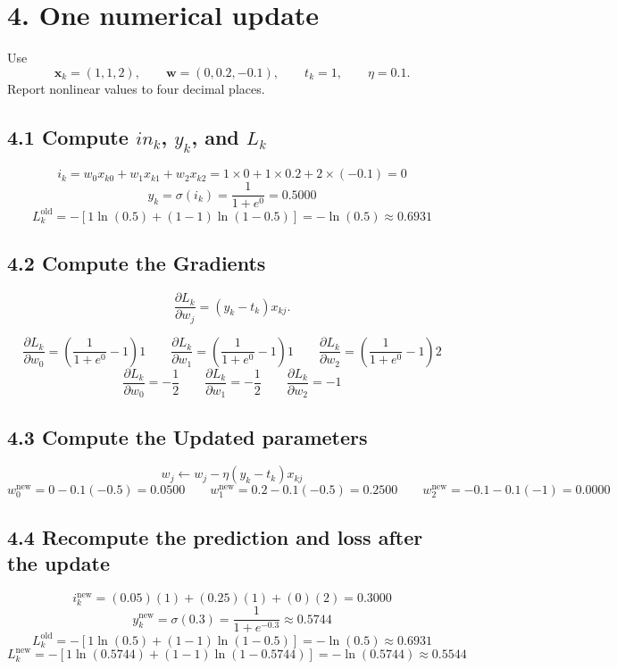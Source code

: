 \documentclass[11pt]{article}
\begin{document}
\section*{4. One numerical update}

Use
\[
\mathbf{x}_k=(1,1,2),\qquad
\mathbf{w}=(0,0.2,-0.1),\qquad
t_k=1,\qquad
\eta=0.1.
\]
Report nonlinear values to four decimal places.

\subsection*{4.1 Compute $in_k$, $y_k$, and $L_k$}
\[
i_k = w_0x_{k0}+w_1x_{k1}+w_2x_{k2} 
= 1\times0 + 1\times0.2 + 2\times(-0.1) = 0
\]
\[
y_k=\sigma(i_k)=\frac{1}{1+e^{0}} = 0.5000
\]
\[
L_k^{\text{old}}=-\left[1\ln(0.5)+(1-1)\ln(1-0.5)\right] = -\ln(0.5) \approx 0.6931
\]

\subsection*{4.2 Compute the Gradients}
\[
\frac{\partial L_k}{\partial w_j}=(y_k-t_k)x_{kj}.
\]

\[
\frac{\partial L_k}{\partial w_0}=(\frac{1}{1+e^{0}}-1)1\qquad
\frac{\partial L_k}{\partial w_1}=(\frac{1}{1+e^{0}}-1)1\qquad
\frac{\partial L_k}{\partial w_2}=(\frac{1}{1+e^{0}}-1)2
\]
\[
\frac{\partial L_k}{\partial w_0}=-\frac{1}{2}\qquad
\frac{\partial L_k}{\partial w_1}=-\frac{1}{2}\qquad
\frac{\partial L_k}{\partial w_2}=-1
\]

\subsection*{4.3 Compute the Updated parameters}
\[
w_j \leftarrow w_j - \eta(y_k-t_k)x_{kj}
\]
\[
w_0^{\text{new}}=0 - 0.1(-0.5) = 0.0500 \qquad
w_1^{\text{new}}=0.2 - 0.1(-0.5) = 0.2500 \qquad
w_2^{\text{new}}=-0.1 - 0.1(-1) = 0.0000  
\]

\subsection*{4.4 Recompute the prediction and loss after the update}
\[
i_k^{\text{new}}=(0.05)(1)+(0.25)(1)+(0)(2)=0.3000
\]
\[
y_k^{\text{new}}=\sigma(0.3)=\frac{1}{1+e^{-0.3}}\approx 0.5744
\]
\[
L_k^{\text{old}}=-\left[1\ln(0.5)+(1-1)\ln(1-0.5)\right] = -\ln(0.5) \approx 0.6931
\]
\[
L_k^{\text{new}}=-\left[1\ln(0.5744)+(1-1)\ln(1-0.5744)\right] = -\ln(0.5744) \approx 0.5544
\]
\end{document}

